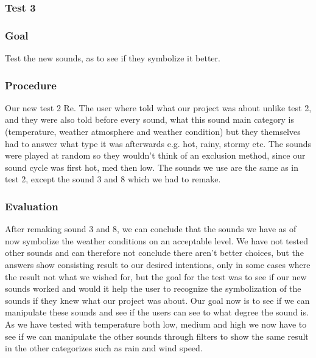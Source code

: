 


\subsubsection{Test 3} %
\label{ssub:test_3}

\subsubsection*{Goal} %
\label{ssub:test_3_goal}

Test the new sounds, as to see if they symbolize it better.


\subsubsection*{Procedure} %
\label{ssub:test_3_procedure}

Our new test 2 Re. 
The user where told what our project was about unlike test 2, and they were also told before every sound, what this sound main category is (temperature, weather atmosphere and weather condition) but they themselves had to answer what type it was afterwards e.g. hot, rainy, stormy etc. 
The sounds were played at random so they wouldn’t think of an exclusion method, since our sound cycle was first hot, med then low. 
The sounds we use are the same as in test 2, except the sound 3 and 8 which we had to remake.


\subsubsection*{Evaluation} %
\label{ssub:test_3_evaluation}

After remaking sound 3 and 8, we can conclude that the sounds we have as of now symbolize the weather conditions on an acceptable level. 
We have not tested other sounds and can therefore not conclude there aren’t better choices, but the answers show consisting result to our desired intentions, only in some cases where the result not what we wished for, but the goal for the test was to see if our new sounds worked and would it help the user to recognize the symbolization of the sounds if they knew what our project was about. 
Our goal now is to see if we can manipulate these sounds and see if the users can see to what degree the sound is. 
As we have tested with temperature both low, medium and high we now have to see if we can manipulate the other sounds through filters to show the same result in the other categorizes such as rain and wind speed.


